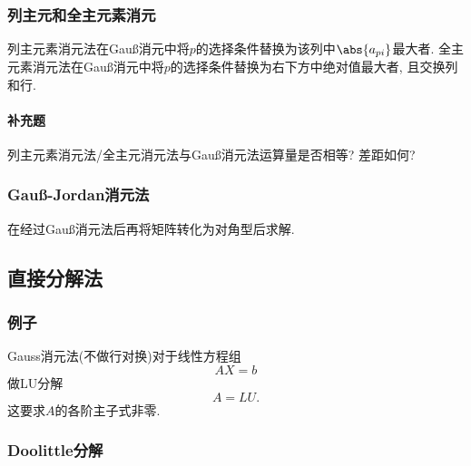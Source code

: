 \documentclass[hidelinks]{ctexart}
\begin{document}

\subsubsection{列主元和全主元素消元} %
\label{ssub:列主元和全主元素消元}

列主元素消元法在Gau\ss 消元中将$p$的选择条件替换为该列中$\abs{a_{pi}}$最大者. 全主元素消元法在Gau\ss 消元中将$p$的选择条件替换为右下方中绝对值最大者, 且交换列和行.

\paragraph{补充题} %
\label{par:补充题}

列主元素消元法/全主元消元法与Gau\ss 消元法运算量是否相等? 差距如何?



\subsubsection{\texorpdfstring{Gau\ss-Jordan}{Gauss-Jordan}消元法} %
\label{ssub:gauss_jordan消元法}

在经过Gau\ss 消元法后再将矩阵转化为对角型后求解.



\subsection{直接分解法} %
\label{sub:直接分解法}

\subsubsection{例子} %
\label{ssub:例子}

Gauss消元法(不做行对换)对于线性方程组
\[ AX = b \]
做LU分解
\[ A = LU. \]
这要求$A$的各阶主子式非零.


\subsubsection{Doolittle分解} %
\label{ssub:doolittle分解}
\end{document}
